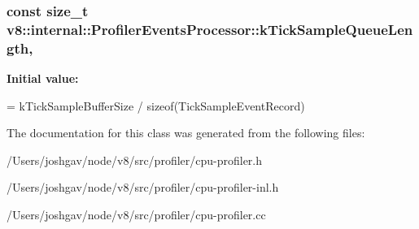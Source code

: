 \subsubsection[{\texorpdfstring{k\+Tick\+Sample\+Queue\+Length}{kTickSampleQueueLength}}]{\setlength{\rightskip}{0pt plus 5cm}const size\+\_\+t v8\+::internal\+::\+Profiler\+Events\+Processor\+::k\+Tick\+Sample\+Queue\+Length\hspace{0.3cm}{\ttfamily [static]}, {\ttfamily [private]}}\hypertarget{classv8_1_1internal_1_1_profiler_events_processor_a7ab4b993c9fc5e588cf76db40696a071}{}\label{classv8_1_1internal_1_1_profiler_events_processor_a7ab4b993c9fc5e588cf76db40696a071}
{\bfseries Initial value\+:}
\begin{DoxyCode}
=
      kTickSampleBufferSize / \textcolor{keyword}{sizeof}(TickSampleEventRecord)
\end{DoxyCode}


The documentation for this class was generated from the following files\+:\begin{DoxyCompactItemize}
\item 
/\+Users/joshgav/node/v8/src/profiler/cpu-\/profiler.\+h\item 
/\+Users/joshgav/node/v8/src/profiler/cpu-\/profiler-\/inl.\+h\item 
/\+Users/joshgav/node/v8/src/profiler/cpu-\/profiler.\+cc\end{DoxyCompactItemize}
